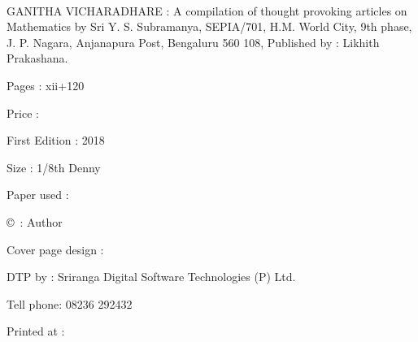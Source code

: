 ~
\thispagestyle{empty}

\noindent
{\rm GANITHA VICHARADHARE : A compilation of thought provoking articles on Mathematics by Sri Y. S. Subramanya, SEPIA/701, H.M. World City, 9th phase, J. P. Nagara, Anjanapura Post, Bengaluru 560 108, Published by : Likhith Prakashana.}

\vfill

\noindent
{\rm Pages : xii+120}

\vfill

\noindent
{\rm Price : }

\vfill

\noindent
{\rm First Edition : 2018}

\vfill

\noindent
{\rm Size : 1/8th Denny}

\vfill

\noindent
{\rm Paper used : }

\vfill

\noindent
{\rm \copyright ~: Author}

\vfill

\noindent
{\rm Cover page design : }

\vfill

\noindent
{\rm DTP by : Sriranga Digital Software Technologies (P) Ltd.}

\noindent
{\rm Tell phone: 08236 292432}

\vfill
\noindent
{\rm Printed at : }

\vfill\eject
